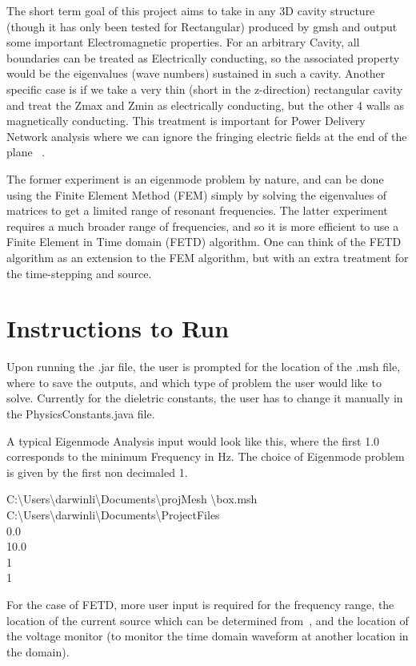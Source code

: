 \documentclass[11pt,a4paper,oldfontcommands]{memoir}
\begin{document}
The short term goal of this project aims to take in any 3D cavity structure (though it has only been tested for Rectangular) produced by gmsh and output some important Electromagnetic properties. For an arbitrary Cavity, all boundaries can be treated as Electrically conducting, so the associated property would be the eigenvalues (wave numbers) sustained in such a cavity. Another specific case is if we take a very thin (short in the z-direction) rectangular cavity and treat the Zmax and Zmin as electrically conducting, but the other 4 walls as magnetically conducting. This treatment is important for Power Delivery Network analysis where we can ignore the fringing electric fields at the end of the plane ~\cite{Swaminathan}.

The former experiment is an eigenmode problem by nature, and can be done using the Finite Element Method (FEM) simply by solving the eigenvalues of matrices to get a limited range of resonant frequencies. The latter experiment requires a much broader range of frequencies, and so it is more efficient to use a Finite Element in Time domain (FETD) algorithm. One can think of the FETD algorithm as an extension to the FEM algorithm, but with an extra treatment for the time-stepping and source.

\section{Instructions to Run}
Upon running the .jar file, the user is prompted for the location of the .msh file, where to save the outputs, and which type of problem the user would like to solve. Currently for the dieletric constants, the user has to change it manually in the PhysicsConstants.java file.

A typical Eigenmode Analysis input would look like this, where the first 1.0 corresponds to the minimum Frequency in Hz. The choice of Eigenmode problem is given by the first non decimaled 1.

C:\textbackslash Users\textbackslash darwinli\textbackslash Documents\textbackslash projMesh \textbackslash box.msh
\\ C:\textbackslash Users\textbackslash darwinli\textbackslash Documents\textbackslash ProjectFiles
\\ 0.0
\\ 10.0
\\ 1
\\ 1


For the case of FETD, more user input is required for the frequency range, the location of the current source which can be determined from~\cite{Swaminathan}, and the location of the voltage monitor (to monitor the time domain waveform at another location in the domain).
\end{document}
